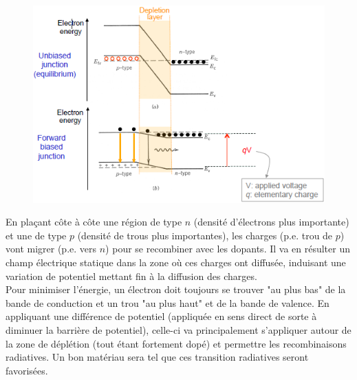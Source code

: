 	\begin{figure}
	\vspace{-5mm}
	\includegraphics[scale=0.6]{ch4/image4}
	\end{figure}
En plaçant côte à côte une région de type $n$ (densité d'électrons plus importante) et une de type
$p$ (densité de trous plus importantes), les charges (p.e. trou de $p$) vont migrer (p.e. vers $n$) 
pour se recombiner avec les dopants. Il va en résulter un champ électrique statique dans la zone où
ces charges ont diffusée, induisant une variation de potentiel mettant fin à la diffusion des 
charges. \\

Pour minimiser l'énergie, un électron doit toujours se trouver "au plus bas" de la bande de conduction
et un trou "au plus haut" et de la bande de valence. En appliquant une différence de potentiel 
(appliquée en sens direct de sorte à diminuer la barrière de potentiel), celle-ci va principalement
s'appliquer autour de la zone de déplétion (tout étant fortement dopé) et permettre les recombinaisons
radiatives. Un bon matériau sera tel que ces transition radiatives seront favorisées.
 
